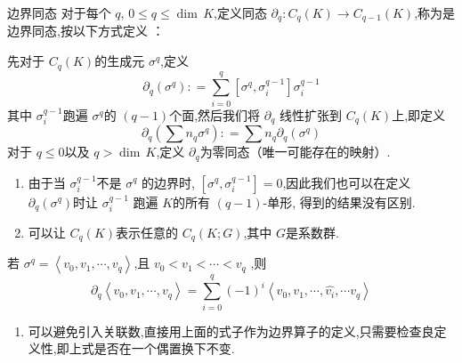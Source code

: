 \documentclass[../../几何与拓扑.tex]{subfiles}
\begin{document}
\begin{definition}{边界同态}
    对于每个 \(  q  \), \(  0\le q\le \operatorname{dim}\,K  \),定义同态 \(  \partial _{q}: C_{q}\left( K \right)\to C_{q-1} \left( K \right)    \),称为是边界同态,按以下方式定义 ：
    
    先对于 \(  C_{q}\left( K \right)   \)的生成元 \(   \sigma ^{q}  \),定义 \[
    \partial _{q}\left(  \sigma ^{q} \right): =  \sum _{i= 0}^{q} [ \sigma ^{q}, \sigma _{i}^{q-1}]  \sigma _{i}^{q-1} 
    \]其中 \(   \sigma _{i}^{q-1}  \)跑遍 \(   \sigma ^{q}  \)的 \(  \left( q-1 \right)   \)个面,然后我们将 \(  \partial _{q}  \)      线性扩张到 \(  C_{q}\left( K \right)   \)上,即定义 \[
    \partial _{q}\left( \sum n_{q} \sigma ^{q} \right): =  \sum n_{q} \partial _{q}\left(  \sigma ^{q} \right)  
    \]对于 \(  q\le 0  \)以及 \(  q>\operatorname{dim}\,K  \),定义 \(  \partial _{q}  \)为零同态（唯一可能存在的映射）.    
    
\end{definition}

\begin{remark}
    \begin{enumerate}
        \item 由于当 \(   \sigma _{i}^{q-1}  \)不是 \(   \sigma ^{q}  \)  的边界时, \(  [ \sigma ^{q}, \sigma _{i}^{q-1}  ]= 0\),因此我们也可以在定义 \(  \partial _{q}\left(  \sigma ^{q} \right)   \)时让 \(   \sigma _{i}^{q-1}  \)   跑遍 \(  K  \)的所有 \(  \left( q-1 \right)   \)-单形,
        得到的结果没有区别.  
        \item 可以让 \(  C_{q}\left( K \right)   \)表示任意的 \(  C_{q}\left( K;G \right)   \),其中 \(  G  \)是系数群.   
    \end{enumerate}
    
\end{remark}

\begin{proposition}
    若 \(   \sigma ^{q}= \left<v_0,v_1,\cdots ,v_{q} \right>  \),且 \(  v_0<v_1<\cdots <v_{q}  \)  ,则 \[
    \partial _{q}\left<v_0,v_1,\cdots ,v_{q} \right>= \sum _{i= 0}^{q} \left( -1 \right)^{i} \left< v_0,v_1,\cdots, \hat{v_{i}},\cdots v_{q}    \right> 
    \]
\end{proposition}


\begin{remark}
    \begin{enumerate}
        \item 可以避免引入关联数,直接用上面的式子作为边界算子的定义,只需要检查良定义性,即上式是否在一个偶置换下不变.
    \end{enumerate}
    
\end{remark}
\end{document}
